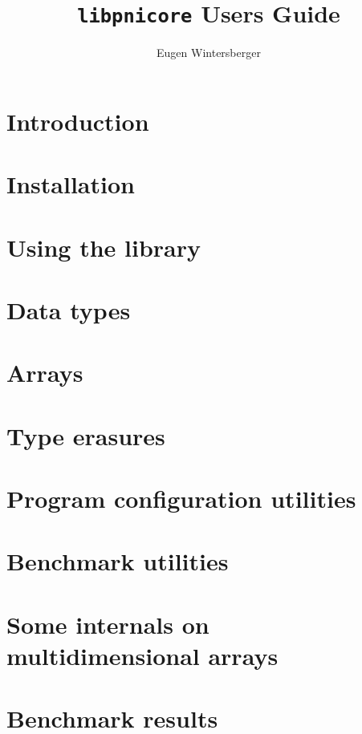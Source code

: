 \documentclass[a4paper,draft]{scrbook}
\title{{\Huge{\tt libpnicore} Users Guide}}
\author{Eugen Wintersberger}
\begin{document}
\maketitle
\tableofcontents
\listoffixmes

\chapter{Introduction}\label{chapter:introduction}

\FloatBarrier

\chapter{Installation}\label{chapter:installation}

\FloatBarrier

\chapter{Using the library}\label{chapter:using_library}

\FloatBarrier 

\chapter{Data types}\label{chapter:data_types}

\FloatBarrier

\chapter{Arrays}\label{chapter:arrays}

\FloatBarrier

\chapter{Type erasures}\label{chapter:type_erasures}

\FloatBarrier

\chapter{Program configuration utilities}\label{chapter:configuration}

\FloatBarrier

\chapter{Benchmark utilities}\label{chapter:benchmark}
\FloatBarrier

\appendix
\chapter{Some internals on multidimensional arrays}

\FloatBarrier

\chapter{Benchmark results}

\FloatBarrier


\end{document}
